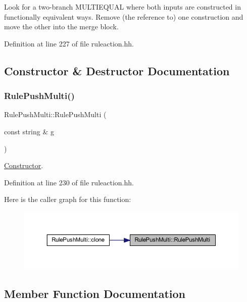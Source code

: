 Look for a two-\/branch M\+U\+L\+T\+I\+E\+Q\+U\+AL where both inputs are constructed in functionally equivalent ways. Remove (the reference to) one construction and move the other into the merge block. 

Definition at line 227 of file ruleaction.\+hh.



\subsection{Constructor \& Destructor Documentation}
\mbox{\label{class_rule_push_multi_ac52f203f4e68376cfef7dac8951c3f95}} 
\subsubsection{\texorpdfstring{RulePushMulti()}{RulePushMulti()}}
{\footnotesize\ttfamily Rule\+Push\+Multi\+::\+Rule\+Push\+Multi (\begin{DoxyParamCaption}\item[{const string \&}]{g }\end{DoxyParamCaption})\hspace{0.3cm}{\ttfamily [inline]}}



\mbox{\hyperlink{class_constructor}{Constructor}}. 



Definition at line 230 of file ruleaction.\+hh.

Here is the caller graph for this function\+:
\nopagebreak
\begin{figure}[H]
\begin{center}
\leavevmode
\includegraphics[width=350pt]{class_rule_push_multi_ac52f203f4e68376cfef7dac8951c3f95_icgraph}
\end{center}
\end{figure}


\subsection{Member Function Documentation}
\mbox{\label{class_rule_push_multi_ae0c4fc01da336893e20b3ea0fb9c4f23}} 
